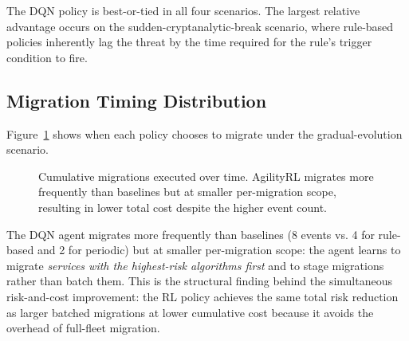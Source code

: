 \documentclass[sigconf,nonacm]{acmart}
\begin{document}
The DQN policy is best-or-tied in all four scenarios. The largest
relative advantage occurs on the sudden-cryptanalytic-break scenario,
where rule-based policies inherently lag the threat by the time
required for the rule's trigger condition to fire.

\subsection{Migration Timing Distribution}

Figure~\ref{fig:timing} shows when each policy chooses to migrate
under the gradual-evolution scenario.

\begin{figure}[h]
\centering
{}
\caption{Cumulative migrations executed over time. AgilityRL migrates
  more frequently than baselines but at smaller per-migration scope,
  resulting in lower total cost despite the higher event count.}
\label{fig:timing}
\end{figure}

The DQN agent migrates more frequently than baselines (8 events vs.
4 for rule-based and 2 for periodic) but at smaller per-migration
scope: the agent learns to migrate \emph{services with the
highest-risk algorithms first} and to stage migrations rather than
batch them. This is the structural finding behind the simultaneous
risk-and-cost improvement: the RL policy achieves the same total
risk reduction as larger batched migrations at lower cumulative cost
because it avoids the overhead of full-fleet migration.
\end{document}
